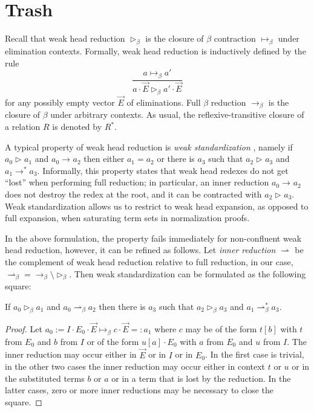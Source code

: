 \documentclass[a4paper,USenglish,cleveref, autoref, thm-restate]{lipics-v2019}
\newcommand{\ru}{\dfrac}
\newcommand{\contract}[1][]{\mapsto_{#1}}
\newcommand{\whd}[1][]{\rhd_{#1}}
\newcommand{\red}[1][]{\longrightarrow_{#1}}
\newcommand{\inner}[1][]{\rightharpoonup_{#1}}
\begin{document}
\clearpage

\appendix

\section{Trash}

Recall that weak head reduction $\whd[\beta]$ is the closure of
$\beta$ contraction $\contract[\beta]$ under elimination contexts.
Formally, weak head reduction is inductively defined by the rule
\[
  \ru{a \contract[\beta] a'
    }{a \cdot \vec E \whd[\beta] a' \cdot \vec E}
\]
for any possibly empty vector $\vec E$ of eliminations.
Full $\beta$ reduction $\red[\beta]$ is the closure of $\beta$ under
arbitrary contexts.  As usual, the reflexive-transitive closure of a
relation $R$ is denoted by $R^*$.

A typical property of weak head reduction is \emph{weak standardization}
\cite{alti:PhD}, namely if $a_0 \whd a_1$ and $a_0 \red a_2$ then
either $a_1 = a_2$ or there is $a_3$ such that $a_2 \whd a_3$ and $a_1 \red^* a_3$.
Informally, this property states that weak head redexes do not get
``lost'' when performing full reduction; in particular, an inner
reduction $a_0 \red a_2$ does not destroy the redex at the root, and
it can be contracted with $a_2 \whd a_3$.
Weak standardization allows us to restrict to weak head expansion, as opposed
to full expansion, when saturating term sets in normalization proofs.

In the above formulation, the property fails immediately for
non-confluent weak head reduction, however, it can be refined as
follows.  Let \emph{inner reduction} $\inner$ be the complement of weak head
reduction relative to full reduction, in our case,
${\inner[\beta]} = {\red[\beta]} \setminus {\whd[\beta]}$.
Then weak standardization can be formulated as the following square:

\begin{lemma}
If $a_0 \whd[\beta] a_1$ and $a_0 \inner[\beta] a_2$ then
there is $a_3$ such that $a_2 \whd[\beta] a_3$ and $a_1 \inner[\beta]^* a_3$.
\end{lemma}
\begin{proof}
  Let $a_0 := I \cdot E_0 \cdot \vec E \contract[\beta] c \cdot \vec E
  =: a_1$ where
  $c$ may be of the form $t[b]$ with $t$ from $E_0$ and $b$ from $I$
  or of the form $u[a] \cdot E_0$ with $a$ from $E_0$ and $u$ from
  $I$.
  The inner reduction may occur either in $\vec E$ or in $I$ or in
  $E_0$.  In the first case is trivial, in the other two cases the
  inner reduction may occur either in context $t$ or $u$ or in the
  substituted terms $b$ or $a$ or in a term that is lost by the
  reduction.  In the latter cases, zero or more inner reductions may
  be necessary to close the square.
\end{proof}
\end{document}
